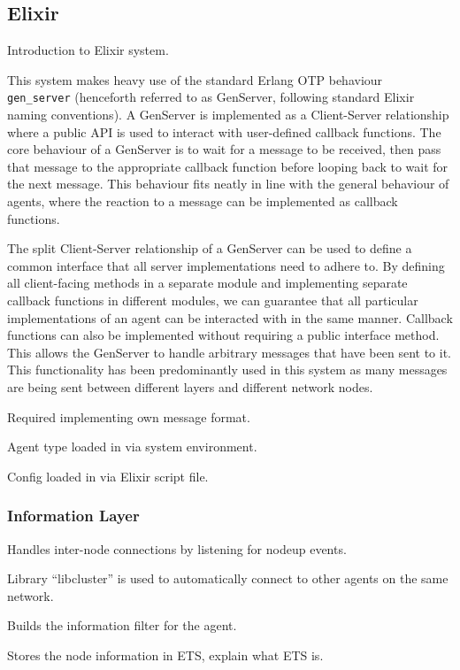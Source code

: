 \subsection{Elixir}

Introduction to Elixir system.

This system makes heavy use of the standard Erlang OTP behaviour\\ \verb|gen_server| (henceforth referred to as GenServer, following standard Elixir naming conventions).
A GenServer is implemented as a Client-Server relationship where a public API is used to interact with user-defined callback functions.
The core behaviour of a GenServer is to wait for a message to be received, then pass that message to the appropriate callback function before looping back to wait for the next message.
This behaviour fits neatly in line with the general behaviour of agents, where the reaction to a message can be implemented as callback functions.

The split Client-Server relationship of a GenServer can be used to define a common interface that all server implementations need to adhere to.
By defining all client-facing methods in a separate module and implementing separate callback functions in different modules, we can guarantee that all particular implementations of an agent can be interacted with in the same manner.
Callback functions can also be implemented without requiring a public interface method.
This allows the GenServer to handle arbitrary messages that have been sent to it.
This functionality has been predominantly used in this system as many messages are being sent between different layers and different network nodes.

Required implementing own message format.

Agent type loaded in via system environment.

Config loaded in via Elixir script file.

\subsubsection{Information Layer}

Handles inter-node connections by listening for nodeup events.

Library ``libcluster'' is used to automatically connect to other agents on the same network.

Builds the information filter for the agent.

Stores the node information in ETS, explain what ETS is.

